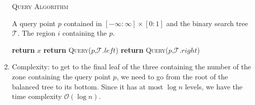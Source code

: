 \documentclass[11pt]{article}
\begin{document}
\begin{enumerate}
    \begin{algorithm}[ht!]
    \caption{\textsc{Query Algorithm}}
    \label{algo2bis}
    \begin{algorithmic}[1]

    \Require A query point $p$ contained in $[- \infty : \infty]\times[0 : 1]$ and the binary search tree $\mathcal{T}$.
    \Ensure The region $i$ containing the $p$.
    
 
         \State \textbf{return} $x$
        \Else
                \State \textbf{return}     \textsc{Query}($p$,$\mathcal{T}.left$)
            \Else
                \State \textbf{return} \textsc{Query}($p$,$\mathcal{T}.right$)
            \EndIf
        \EndIf

    \EndFunction
    
    \end{algorithmic}
    \end{algorithm}

\item Complexity: to get to the final leaf of the three containing the number of the zone containing the query point $p$, we need to go from the root of the balanced tree to its bottom. Since it has at most $\log n$ levels, we have the time complexity $\mathcal{O} (\log n)$. 
    
\end{enumerate}


\FloatBarrier
\newpage















\section{}
\end{document}
